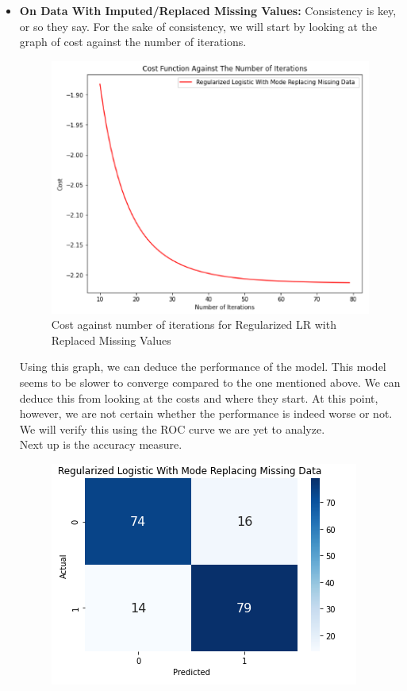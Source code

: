 \begin{itemize}
    \item \textbf{On Data With Imputed/Replaced Missing Values:} Consistency is key, or so they say. For the sake of consistency, we will start by looking at the graph of cost against the number of iterations. 
    \begin{figure}[H]
        \begin{center}
            \includegraphics[scale=0.6]{Images/RR_C.png} 
        \end{center}
        \caption{Cost against number of iterations for Regularized LR with Replaced Missing Values}
    \end{figure}
    Using this graph, we can deduce the performance of the model. This model seems to be slower to converge compared to the one mentioned above. We can deduce this from looking at the costs and where they start. At this point, however, we are not certain whether the performance is indeed worse or not. We will verify this using the ROC curve we are yet to analyze.
    \\
    Next up is the accuracy measure. 
    \begin{figure}[H]
        \begin{center}
            \includegraphics[scale=0.6]{Images/RR_CM.png}

\end{center}
\end{figure}
\end{itemize}
